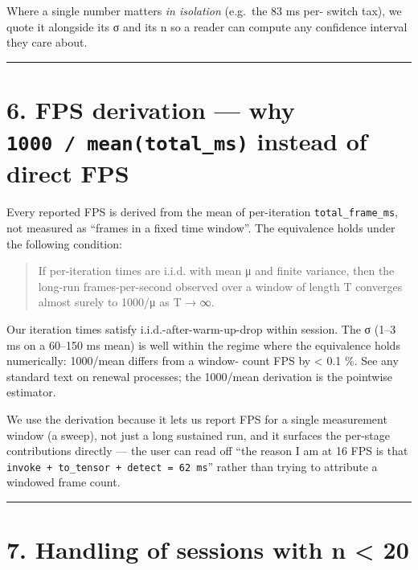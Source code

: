 Where a single number matters \emph{in isolation} (e.g.~the 83 ms per-
switch tax), we quote it alongside its σ and its n so a reader can
compute any confidence interval they care about.

\begin{center}\rule{0.5\linewidth}{0.5pt}\end{center}

\section{\texorpdfstring{6. FPS derivation --- why
\texttt{1000\ /\ mean(total\_ms)} instead of direct
FPS}{6. FPS derivation --- why 1000 / mean(total\_ms) instead of direct FPS}}\label{fps-derivation-why-1000-meantotal_ms-instead-of-direct-fps}

Every reported FPS is derived from the mean of per-iteration
\texttt{total\_frame\_ms}, not measured as ``frames in a fixed time
window''. The equivalence holds under the following condition:

\begin{quote}
If per-iteration times are i.i.d. with mean μ and finite variance, then
the long-run frames-per-second observed over a window of length T
converges almost surely to 1000/μ as T → ∞.
\end{quote}

Our iteration times satisfy i.i.d.-after-warm-up-drop within session.
The σ (1--3 ms on a 60--150 ms mean) is well within the regime where the
equivalence holds numerically: 1000/mean differs from a window- count
FPS by \textless{} 0.1 \%. See any standard text on renewal processes;
the 1000/mean derivation is the pointwise estimator.

We use the derivation because it lets us report FPS for a single
measurement window (a sweep), not just a long sustained run, and it
surfaces the per-stage contributions directly --- the user can read off
``the reason I am at 16 FPS is that
\texttt{invoke\ +\ to\_tensor\ +\ detect\ =\ 62\ ms}'' rather than
trying to attribute a windowed frame count.

\begin{center}\rule{0.5\linewidth}{0.5pt}\end{center}

\section{7. Handling of sessions with n \textless{}
20}\label{handling-of-sessions-with-n-20}

